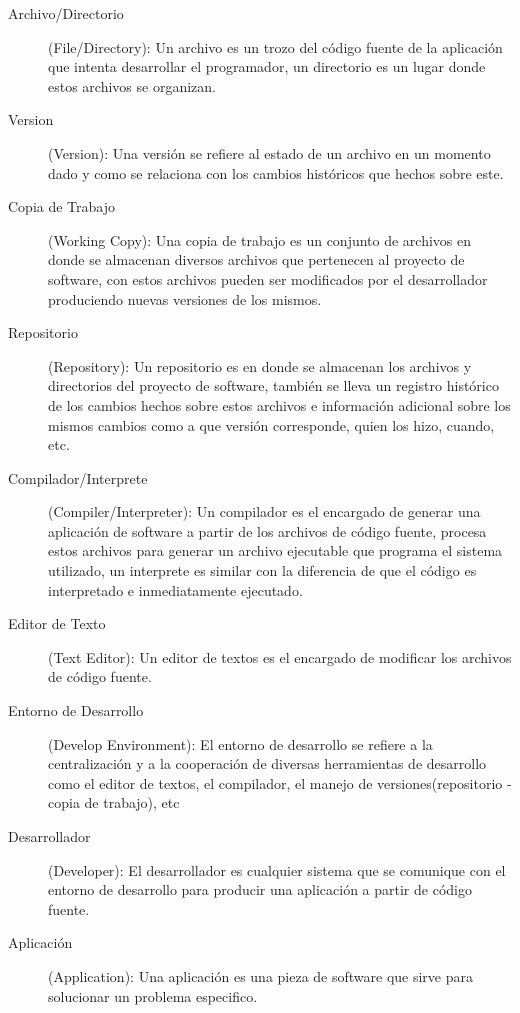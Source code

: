 \begin{description}
	
	\item [Archivo/Directorio](File/Directory): \newline
	Un archivo es un trozo del código fuente de la aplicación que intenta desarrollar el programador, un directorio es un lugar donde estos archivos se organizan.
	
	\item [Version](Version): \newline
	Una versión se refiere al estado de un archivo en un momento dado y como se relaciona con los cambios históricos que hechos sobre este.
	
	\item [Copia de Trabajo](Working Copy): \newline
	Una copia de trabajo es un conjunto de archivos en donde se almacenan diversos archivos que pertenecen al proyecto de software, con estos archivos pueden ser modificados por el desarrollador produciendo nuevas versiones de los mismos.
	
	\item [Repositorio](Repository): \newline
	Un repositorio es en donde se almacenan los archivos y directorios del proyecto de software, también se lleva un registro histórico de los cambios hechos sobre estos archivos e información adicional sobre los mismos cambios como a que versión corresponde, quien los hizo, cuando, etc.
	
	\item [Compilador/Interprete](Compiler/Interpreter): \newline
	Un compilador es el encargado de generar una aplicación de software a partir de los archivos de código fuente, procesa estos archivos para generar un archivo ejecutable que programa el sistema utilizado, un interprete es similar con la diferencia de que el código es interpretado e inmediatamente ejecutado.
	
	\item [Editor de Texto](Text Editor): \newline
	Un editor de textos es el encargado de modificar los archivos de código fuente.
	
	\item [Entorno de Desarrollo](Develop Environment): \newline
	El entorno de desarrollo se refiere a la centralización y a la cooperación de diversas herramientas de desarrollo como el editor de textos, el compilador, el manejo de versiones(repositorio - copia de trabajo), etc
	
	\item [Desarrollador](Developer): \newline
	El desarrollador es cualquier sistema que se comunique con el entorno de desarrollo para producir una aplicación a partir de código fuente.
	
	\item [Aplicación](Application): \newline
	Una aplicación es una pieza de software que sirve para solucionar un problema especifico.
	
\end{description}

